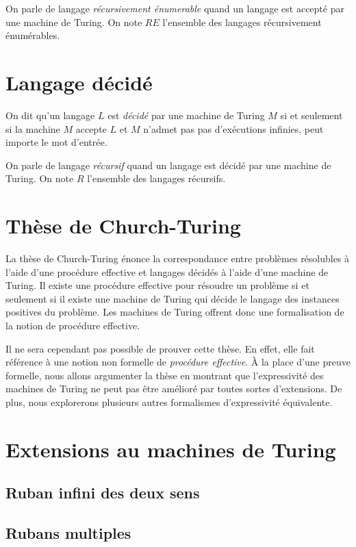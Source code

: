 On parle de langage \og \textit{récursivement énumerable} \fg{} quand un langage est accepté par une machine de Turing.
On note $RE$ l'ensemble des langages récursivement énumérables.

\section{Langage décidé}

On dit qu'un langage $L$ est \og \textit{décidé} \fg{} par une machine de Turing $M$ si et seulement si la machine $M$ accepte $L$ et $M$ n'admet pas pas d'exécutions infinies, peut importe le mot d'entrée.

On parle de langage \og \textit{récursif} \fg{} quand un langage est décidé par une machine de Turing.
On note $R$ l'ensemble des langages récursifs.

\section{Thèse de Church-Turing}

La thèse de Church-Turing énonce la correspondance entre problèmes résolubles à l'aide d'une procédure effective et langages décidés à l'aide d'une machine de Turing. Il existe une procédure effective pour résoudre un problème si et seulement si il existe une machine de Turing qui décide le langage des instances positives du problème. Les machines de Turing offrent donc une formalisation de la notion de procédure effective.

Il ne sera cependant pas possible de prouver cette thèse.
En effet, elle fait référence à une notion non formelle de \textit{procédure effective}.
À la place d'une preuve formelle, nous allons argumenter la thèse en montrant que l'expressivité des machines de Turing ne peut pas être amélioré par toutes sortes d'extensions.
De plus, nous explorerons plusieurs autres formalismes d'expressivité équivalente.

\section{Extensions au machines de Turing}

\subsection{Ruban infini des deux sens}

\subsection{Rubans multiples}

